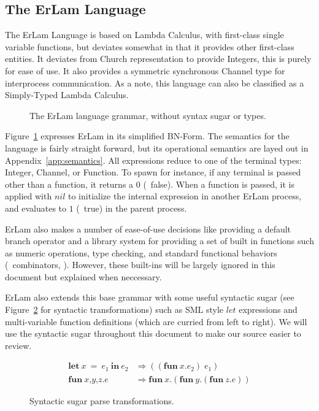 \subsection{The ErLam Language}\label{sec:the erlam language}

The ErLam Language is based on Lambda Calculus, with first-class single 
variable functions, but deviates somewhat in that it provides other first-class 
entities. It deviates from Church representation to provide Integers, this is
purely for ease of use. It also provides a symmetric synchronous Channel type 
for interprocess communication. As a note, this language can also be classified 
as a Simply-Typed Lambda Calculus.

\begin{figure} %
\centering
{\footnotesize
    
}
\caption{The ErLam language grammar, without syntax sugar or types.}
\label{fig:grammer}
\end{figure}

Figure~\ref{fig:grammer} expresses ErLam in its simplified BN-Form. The 
semantics for the language is fairly straight forward, but its operational 
semantics are layed out in Appendix~\ref{app:semantics}. All expressions reduce
to one of the terminal types: Integer, Channel, or Function. To spawn for 
instance, if any terminal is passed other than a function, it returns a $0$
(\eg~false). When a function is passed, it is applied with $nil$ to 
initialize the internal expression in another ErLam process, and evaluates to $1$ (\eg~true) in the parent process.

ErLam also makes a number of ease-of-use decisions like providing a default 
branch operator and a library system for providing a set of built in functions 
such as numeric operations, type checking, and standard functional behaviors 
(\eg~combinators, \etc). However, these built-ins will be largely ignored in 
this document but explained when neccessary. 

ErLam also extends this base grammar with some useful syntactic sugar (see 
Figure~\ref{fig:sugar-transform} for syntactic transformations) such as SML 
style $let$ expressions and multi-variable function definitions (which are 
curried from left to right). We will use the syntactic sugar throughout this 
document to make our source easier to review.

\begin{figure}
    \centering
    \begin{align*}
        \textbf{let}\: x\: =\: e_1\: \textbf{in}\: e_2
        & \Rightarrow
        ((\textbf{fun}\: x.e_2)\; e_1) \\
% 
        \textbf{fun}\: \textit{x,y,z} . \textit{e}
        & \Rightarrow
        \textbf{fun}\: \textit{x} . (\textbf{fun}\: \textit{y} . (\textbf{fun}\: \textit{z} . \textit{e} ))
    \end{align*}
    \caption{Syntactic sugar parse transformations.}
    \label{fig:sugar-transform}
\end{figure}

